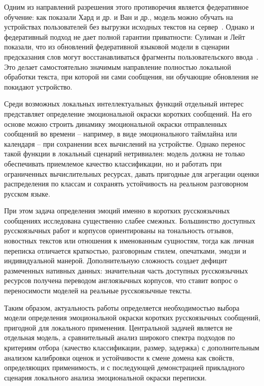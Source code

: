 \documentclass[12pt,a4paper]{report}
\begin{document}
Одним из направлений разрешения этого противоречия является федеративное обучение: как показали Хард и др. и Ван и др., модель можно обучать на устройствах пользователей без выгрузки исходных текстов на сервер~\cite{hard2018federated,wang2019federated}. Однако и федеративный подход не дает полной гарантии приватности: Сулиман и Лейт показали, что из обновлений федеративной языковой модели в сценарии предсказания слов могут восстанавливаться фрагменты пользовательского ввода~\cite{suliman2022gboard}. Это делает самостоятельно значимым направление полностью локальной обработки текста, при которой ни сами сообщения, ни обучающие обновления не покидают устройство.

Среди возможных локальных интеллектуальных функций отдельный интерес представляет определение эмоциональной окраски коротких сообщений. На его основе можно строить динамику эмоциональной окраски отправленных сообщений во времени -- например, в виде эмоционального таймлайна или календаря -- при сохранении всех вычислений на устройстве. Однако перенос такой функции в локальный сценарий нетривиален: модель должна не только обеспечивать приемлемое качество классификации, но и работать при ограниченных вычислительных ресурсах, давать пригодные для агрегации оценки распределения по классам и сохранять устойчивость на реальном разговорном русском языке.

При этом задача определения эмоций именно в коротких русскоязычных сообщениях исследована существенно слабее смежных. Большинство доступных русскоязычных работ и корпусов ориентированы на тональность отзывов, новостных текстов или отношения к именованным сущностям, тогда как личная переписка отличается краткостью, разговорным стилем, опечатками, эмодзи и индивидуальной манерой. Дополнительную сложность создает дефицит размеченных нативных данных: значительная часть доступных русскоязычных ресурсов получена переводом англоязычных корпусов, что ставит вопрос о переносимости моделей на реальные русскоязычные тексты.

Таким образом, актуальность работы определяется необходимостью выбора модели определения эмоциональной окраски коротких русскоязычных сообщений, пригодной для локального применения. Центральной задачей является не отдельная модель, а сравнительный анализ широкого спектра подходов по критериям отбора (качество классификации, размер, задержка) с дополнительным анализом калибровки оценок и устойчивости к смене домена как свойств, определяющих применимость, и с последующей демонстрацией прикладного сценария локального анализа эмоциональной окраски переписки.
\end{document}
